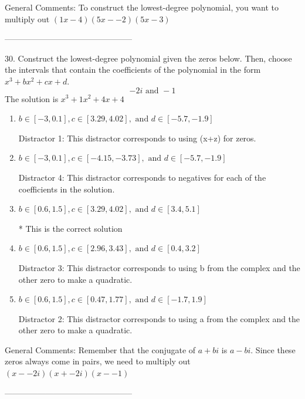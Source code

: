 \documentclass{article}[10pt]
\begin{document}
General Comments: To construct the lowest-degree polynomial, you want to multiply out $(1x-4)(5x--2)(5x-3)$

-----------------------------------------------

30. Construct the lowest-degree polynomial given the zeros below. Then, choose the intervals that contain the coefficients of the polynomial in the form $x^3+bx^2+cx+d$.
$$ -2i \text{ and } -1 $$ 
The solution is $ x^3 + 1 x^2 + 4 x + 4 $ 

\begin{enumerate}[label=\Alph*.] 
\item $ b \in [-3, 0.1], c \in [3.29, 4.02], \text{ and } d \in [-5.7, -1.9] $ 

  Distractor 1: This distractor corresponds to using (x+z) for zeros. 
\item $ b \in [-3, 0.1], c \in [-4.15, -3.73], \text{ and } d \in [-5.7, -1.9] $ 

  Distractor 4: This distractor corresponds to negatives for each of the coefficients in the solution. 
\item $ b \in [0.6, 1.5], c \in [3.29, 4.02], \text{ and } d \in [3.4, 5.1] $ 

 * This is the correct solution 
\item $ b \in [0.6, 1.5], c \in [2.96, 3.43], \text{ and } d \in [0.4, 3.2] $ 

  Distractor 3: This distractor corresponds to using b from the complex and the other zero to make a quadratic. 
\item $ b \in [0.6, 1.5], c \in [0.47, 1.77], \text{ and } d \in [-1.7, 1.9] $ 

  Distractor 2: This distractor corresponds to using a from the complex and the other zero to make a quadratic. 
\end{enumerate} 
 
General Comments: Remember that the conjugate of $a+bi$ is $a-bi$. Since these zeros always come in pairs, we need to multiply out $(x--2i)(x+-2i)(x--1)$

-----------------------------------------------
\end{document}
